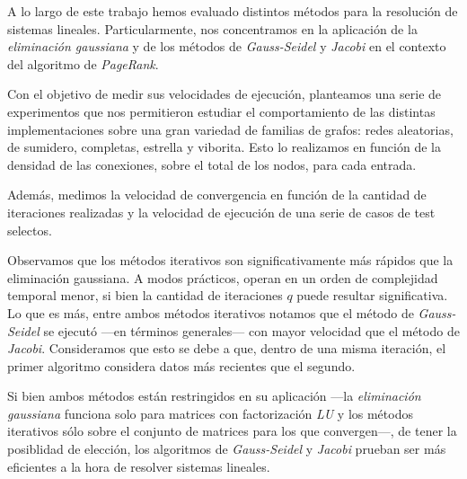 A lo largo de este trabajo hemos evaluado distintos métodos para la resolución de sistemas lineales. Particularmente, nos concentramos en la aplicación de la \textit{eliminación gaussiana} y de los métodos de \textit{Gauss-Seidel} y \textit{Jacobi} en el contexto del algoritmo de \textit{PageRank}. 

Con el objetivo de medir sus velocidades de ejecución, planteamos una serie de experimentos que nos permitieron estudiar el comportamiento de las distintas implementaciones sobre una gran variedad de familias de grafos: redes aleatorias, de sumidero, completas, estrella y viborita. Esto lo realizamos en función de la densidad de las conexiones, sobre el total de los nodos, para cada entrada.

Además, medimos la velocidad de convergencia en función de la cantidad de iteraciones realizadas y la velocidad de ejecución de una serie de casos de test selectos.

\vspace{1em}
Observamos que los métodos iterativos son significativamente más rápidos que la eliminación gaussiana. A modos prácticos, operan en un orden de complejidad temporal menor, si bien la cantidad de iteraciones $q$ puede resultar significativa. Lo que es más, entre ambos métodos iterativos notamos que el método de \textit{Gauss-Seidel} se ejecutó ---en términos generales--- con mayor velocidad que el método de \textit{Jacobi}. Consideramos que esto se debe a que, dentro de una misma iteración, el primer algoritmo considera datos más recientes que el segundo.

\vspace{1em}
Si bien ambos métodos están restringidos en su aplicación ---la \textit{eliminación gaussiana} funciona solo para matrices con factorización \textit{LU} y los métodos iterativos sólo sobre el conjunto de matrices para los que convergen---, de tener la posiblidad de elección, los algoritmos de \textit{Gauss-Seidel} y \textit{Jacobi} prueban ser más eficientes a la hora de resolver sistemas lineales.